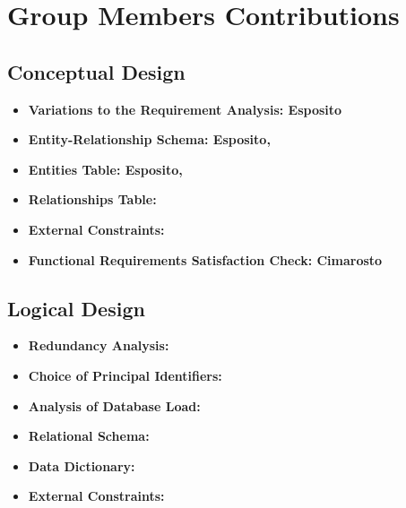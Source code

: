 \section{Group Members Contributions}


\subsection{Conceptual Design}
\begin{itemize}
	\item \textbf{Variations to the Requirement Analysis: Esposito}
	\item \textbf{Entity-Relationship Schema: Esposito, }
	\item \textbf{Entities Table: Esposito, }
	\item \textbf{Relationships Table: }
	\item \textbf{External Constraints:}
	\item \textbf{Functional Requirements Satisfaction Check: Cimarosto}
\end{itemize}

\subsection{Logical Design}
\begin{itemize}
	\item \textbf{Redundancy Analysis:} 
	\item \textbf{Choice of Principal Identifiers:}
	\item \textbf{Analysis of Database Load:}
	\item \textbf{Relational Schema:}
	\item \textbf{Data Dictionary:}
	\item \textbf{External Constraints:}
\end{itemize}	